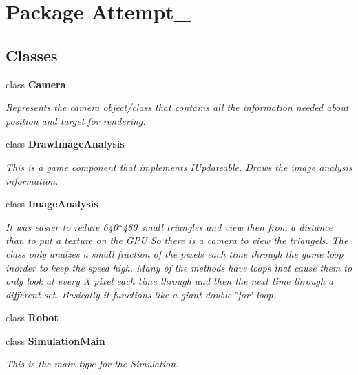 \section{Package Attempt\_}
\label{namespace_attempt__7}
\subsection*{Classes}
\begin{DoxyCompactItemize}
\item 
class {\bf Camera}
\begin{DoxyCompactList}\small\item\em Represents the camera object/class that contains all the information needed about position and target for rendering. \item\end{DoxyCompactList}\item 
class {\bf DrawImageAnalysis}
\begin{DoxyCompactList}\small\item\em This is a game component that implements IUpdateable. Draws the image analysis information. \item\end{DoxyCompactList}\item 
class {\bf ImageAnalysis}
\begin{DoxyCompactList}\small\item\em It was easier to redure 640$\ast$480 small triangles and view then from a distance than to put a texture on the GPU So there is a camera to view the triangels. The class only analzes a small fraction of the pixels each time through the game loop inorder to keep the speed high. Many of the methods have loops that cause them to only look at every X pixel each time through and then the next time through a different set. Basically it functions like a giant double \char`\"{}for\char`\"{} loop. \item\end{DoxyCompactList}\item 
class {\bf Robot}
\item 
class {\bf SimulationMain}
\begin{DoxyCompactList}\small\item\em This is the main type for the Simulation. \item\end{DoxyCompactList}\end{DoxyCompactItemize}
